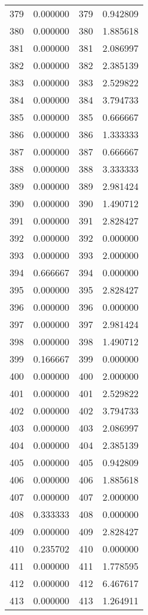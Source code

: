 \documentclass[12pt]{article}
\begin{document}
\begin{longtable}{@{}cccc@{}}
379 & 0.000000 & 379 & 0.942809 \\
380 & 0.000000 & 380 & 1.885618 \\
381 & 0.000000 & 381 & 2.086997 \\
382 & 0.000000 & 382 & 2.385139 \\
383 & 0.000000 & 383 & 2.529822 \\
384 & 0.000000 & 384 & 3.794733 \\
385 & 0.000000 & 385 & 0.666667 \\
386 & 0.000000 & 386 & 1.333333 \\
387 & 0.000000 & 387 & 0.666667 \\
388 & 0.000000 & 388 & 3.333333 \\
389 & 0.000000 & 389 & 2.981424 \\
390 & 0.000000 & 390 & 1.490712 \\
391 & 0.000000 & 391 & 2.828427 \\
392 & 0.000000 & 392 & 0.000000 \\
393 & 0.000000 & 393 & 2.000000 \\
394 & 0.666667 & 394 & 0.000000 \\
395 & 0.000000 & 395 & 2.828427 \\
396 & 0.000000 & 396 & 0.000000 \\
397 & 0.000000 & 397 & 2.981424 \\
398 & 0.000000 & 398 & 1.490712 \\
399 & 0.166667 & 399 & 0.000000 \\
400 & 0.000000 & 400 & 2.000000 \\
401 & 0.000000 & 401 & 2.529822 \\
402 & 0.000000 & 402 & 3.794733 \\
403 & 0.000000 & 403 & 2.086997 \\
404 & 0.000000 & 404 & 2.385139 \\
405 & 0.000000 & 405 & 0.942809 \\
406 & 0.000000 & 406 & 1.885618 \\
407 & 0.000000 & 407 & 2.000000 \\
408 & 0.333333 & 408 & 0.000000 \\
409 & 0.000000 & 409 & 2.828427 \\
410 & 0.235702 & 410 & 0.000000 \\
411 & 0.000000 & 411 & 1.778595 \\
412 & 0.000000 & 412 & 6.467617 \\
413 & 0.000000 & 413 & 1.264911 \\

\end{longtable}
\end{document}
